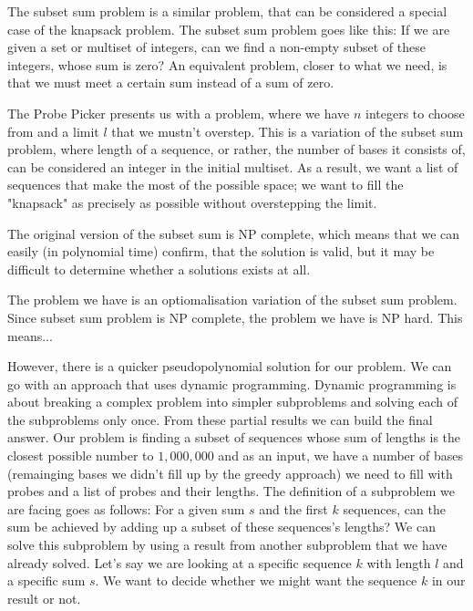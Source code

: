 The subset sum problem is a similar problem, that can be considered a special case of the knapsack problem. The subset sum problem goes like this: If we are given a set or multiset 
of integers, can we find a non-empty subset of these integers, whose sum is zero? An equivalent problem, closer to what we need, is that we must meet a certain sum instead of a sum of 
zero. 

The Probe Picker presents us with a problem, where we have $n$ integers to choose from and a limit $l$ that we mustn't overstep. This is a variation of the subset sum problem, 
where length of a sequence, or rather, the number of bases it consists of, can be considered an integer in the initial multiset. As a result, we want a list of sequences that make the 
most of the possible space; we want to fill the "knapsack" as precisely as possible without overstepping the limit. 

The original version of the subset sum is NP complete, which means that we can easily (in polynomial time) confirm, that the solution is valid, but it may be difficult to determine whether a 
solutions exists at all. 

The problem we have is an optiomalisation variation of the subset sum problem. Since subset sum problem is NP complete, the problem we have is NP hard. This means... 

However, there is a quicker pseudopolynomial solution for our problem. We can go with an approach that uses dynamic programming. 
Dynamic programming is about breaking a complex problem into simpler subproblems and solving each of the subproblems only once. From these partial results we can build the final answer. 
Our problem is finding a subset of sequences whose sum of lengths is the closest possible number to $1,000,000$ and as an input, we have a number of bases (remainging bases we didn't fill up by the greedy 
approach) we need to fill with probes and a list of probes and their lengths. 
The definition of a subproblem we are facing goes as follows: 
For a given sum $s$ and the first $k$ sequences, can the sum be achieved by adding up a subset of these sequences's lengths? 
We can solve this subproblem by using a result from another subproblem that we have already solved. 
Let's say we are looking at a specific sequence $k$ with length $l$ and a specific sum $s$. We want to decide whether we might want the sequence $k$ in our result or not. 

